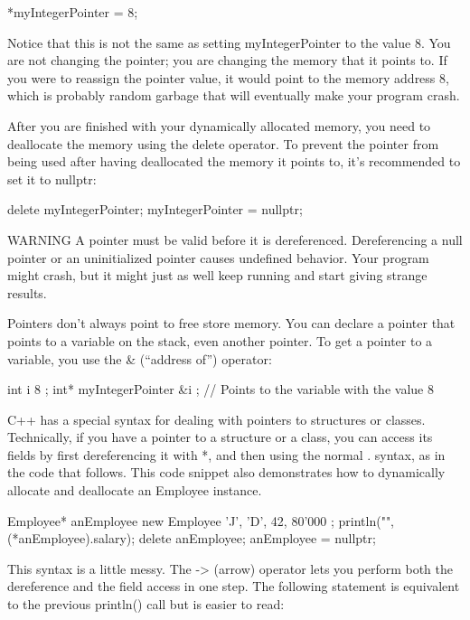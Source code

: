 \begin{cpp}
*myIntegerPointer = 8;
\end{cpp}

Notice that this is not the same as setting myIntegerPointer to the value 8. You are not changing the pointer; you are changing the memory that it points to. If you were to reassign the pointer value, it would point to the memory address 8, which is probably random garbage that will eventually make your program crash.

After you are finished with your dynamically allocated memory, you need to deallocate the memory using the delete operator. To prevent the pointer from being used after having deallocated the memory it points to, it’s recommended to set it to nullptr:

\begin{cpp}
delete myIntegerPointer;
myIntegerPointer = nullptr;
\end{cpp}

\begin{myWarning}{WARNING}
A pointer must be valid before it is dereferenced. Dereferencing a null pointer or an uninitialized pointer causes undefined behavior. Your program might crash, but it might just as well keep running and start giving strange results.
\end{myWarning}

Pointers don’t always point to free store memory. You can declare a pointer that points to a variable on the stack, even another pointer. To get a pointer to a variable, you use the \& (“address of”) operator:

\begin{cpp}
int i { 8 };
int* myIntegerPointer { &i }; // Points to the variable with the value 8
\end{cpp}

C++ has a special syntax for dealing with pointers to structures or classes. Technically, if you have a pointer to a structure or a class, you can access its fields by first dereferencing it with *, and then using the normal . syntax, as in the code that follows. This code snippet also demonstrates how to dynamically allocate and deallocate an Employee instance.

\begin{cpp}
Employee* anEmployee { new Employee { 'J', 'D', 42, 80'000 } };
println("{}", (*anEmployee).salary);
delete anEmployee; anEmployee = nullptr;
\end{cpp}

This syntax is a little messy. The -> (arrow) operator lets you perform both the dereference and the field access in one step. The following statement is equivalent to the previous println() call but is easier to read:

